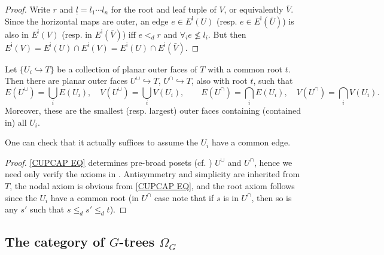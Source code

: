 \documentclass[a4paper,10pt
,draft
]{article}%
\begin{document}
\begin{proof}
	Write $r$ and $\underline{l}=l_1\cdots l_n$
	for the root and leaf tuple of $V$, or equivalently $\bar{V}$.
	Since the horizontal maps are outer, an edge
	$e \in E^{\mathsf{i}}(U)$ (resp. $e \in E^{\mathsf{i}}(\bar{U})$)
	is also in $E^{\mathsf{i}}(V)$ (resp. in $E^{\mathsf{i}}(\bar{V})$) iff
	$e <_d r$ and $\forall_i e \not \leq l_i$.
	But then $E^{\mathsf{i}}(V) = E^{\mathsf{i}}(U) \cap E^{\mathsf{i}}(V) = E^{\mathsf{i}}(U) \cap E^{\mathsf{i}}(\bar{V})$. 
\end{proof}


\begin{lemma}\label{CUPCAP LEM}
	Let $\{U_i \hookrightarrow T\}$ be a collection of planar outer faces of $T$ with a common root $t$. Then there are planar outer faces
	$U^{\cup} \hookrightarrow T$, $U^{\cap} \hookrightarrow T$,
	also with root $t$, such that
\begin{equation}\label{CUPCAP EQ}
	E(U^{\cup}) = \bigcup_i E(U_i), \quad
	V(U^{\cup}) = \bigcup_i V(U_i), \qquad
	E(U^{\cap}) = \bigcap_i E(U_i), \quad
	V(U^{\cap}) = \bigcap_i V(U_i).
\end{equation}
Moreover, these are the smallest (resp. largest) outer faces
containing (contained in) all $U_i$.
\end{lemma}

\begin{remark}
	One can check that it actually suffices to assume the $U_i$ have a common edge.
\end{remark}

\begin{proof}
	\eqref{CUPCAP EQ} determines pre-broad posets 
	(cf. \cite[Rem. 5.2]{Per17}) $U^{\cup}$ and $U^{\cap}$,
	hence we need only verify the axioms in 
	\cite[Defs. 5.1, 5.3, 5.9]{Per17}. 
	Antisymmetry and simplicity are inherited from $T$, the nodal axiom is obvious from \eqref{CUPCAP EQ}, and the root axiom follows since the $U_i$ have a common root (in $U^{\cap}$ case note that if $s$ is in $U^{\cap}$, then so is any $s'$ such that
	$s \leq_d s' \leq_d t$).
\end{proof}



\subsection{The category of $G$-trees $\Omega_G$}
\end{document}
